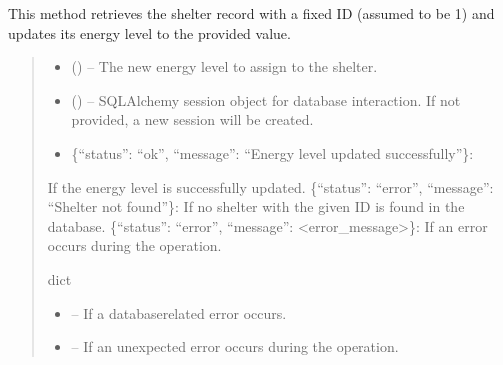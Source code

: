 \documentclass[letterpaper,10pt,english]{sphinxmanual}
\begin{document}
\begin{fulllineitems}
\begin{fulllineitems}
\sphinxAtStartPar
This method retrieves the shelter record with a fixed ID (assumed to be 1) and updates
its energy level to the provided value.
\begin{quote}\begin{description}
\begin{itemize}
\item {} 
\sphinxAtStartPar
{} () – The new energy level to assign to the shelter.

\item {} 
\sphinxAtStartPar
{} (\sphinxstyleliteralemphasis{\sphinxupquote{, }}) – SQLAlchemy session object for database interaction.
If not provided, a new session will be created.

\end{itemize}

\sphinxAtStartPar
\begin{description}
\begin{itemize}
\item {} 
\sphinxAtStartPar
\{“status”: “ok”, “message”: “Energy level updated successfully”\}:

\end{itemize}

\sphinxAtStartPar
If the energy level is successfully updated.
\sphinxhyphen{} \{“status”: “error”, “message”: “Shelter not found”\}:
If no shelter with the given ID is found in the database.
\sphinxhyphen{} \{“status”: “error”, “message”: <error\_message>\}:
If an error occurs during the operation.

\end{description}


\sphinxAtStartPar
dict

\begin{itemize}
\item {} 
\sphinxAtStartPar
{} – If a database\sphinxhyphen{}related error occurs.

\item {} 
\sphinxAtStartPar
{} – If an unexpected error occurs during the operation.


\end{itemize}
\end{description}
\end{quote}
\end{fulllineitems}
\end{fulllineitems}
\end{document}
